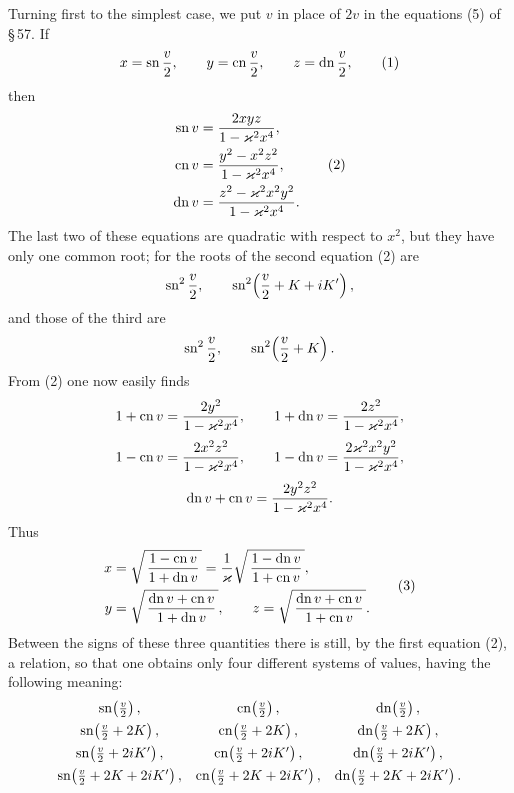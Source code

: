 \documentclass[11pt]{article}
\providecommand{\sn}{\operatorname{sn}}
\providecommand{\cn}{\operatorname{cn}}
\providecommand{\dn}{\operatorname{dn}}
\begin{document}
Turning first to the simplest case, we put $v$ in place of $2v$ in the equations (5) of
\S\,57. If
\begin{equation}
x=\sn {v\over2},\qquad y=\cn {v\over2},\qquad z=\dn {v\over2},
\tag{1}
\end{equation}
then
\begin{equation}
\begin{aligned}
\sn v&={2xyz\over1-\varkappa^2x^4},\\
\cn v&={y^2-x^2z^2\over1-\varkappa^2x^4},\\
\dn v&={z^2-\varkappa^2x^2y^2\over1-\varkappa^2x^4}.
\end{aligned}
\tag{2}
\end{equation}
The last two of these equations are quadratic with respect to $x^2$, but they have only
one common root; for the roots of the second equation (2) are
\[
\sn^2{v\over2},\qquad \sn^2\!\left({v\over2}+K+iK'\right),
\]
and those of the third are
\[
\sn^2{v\over2},\qquad \sn^2\!\left({v\over2}+K\right).
\]
From (2) one now easily finds
\[
1+\cn v={2y^2\over1-\varkappa^2x^4},\qquad
1+\dn v={2z^2\over1-\varkappa^2x^4},
\]
\[
1-\cn v={2x^2z^2\over1-\varkappa^2x^4},\qquad
1-\dn v={2\varkappa^2x^2y^2\over1-\varkappa^2x^4},
\]
\[
\dn v+\cn v={2y^2z^2\over1-\varkappa^2x^4}.
\]
Thus
\begin{equation}
\begin{aligned}
x&=\sqrt{\,{1-\cn v\over1+\dn v}\,}
={1\over\varkappa}\sqrt{\,{1-\dn v\over1+\cn v}\,},\\
y&=\sqrt{\,{\dn v+\cn v\over1+\dn v}\,},
\qquad
z=\sqrt{\,{\dn v+\cn v\over1+\cn v}\,}.
\end{aligned}
\tag{3}
\end{equation}
Between the signs of these three quantities there is still, by the first equation (2), a
relation, so that one obtains only four different systems of values, having the following
meaning:
\[
\begin{array}{ccc}
\sn\!\left({v\over2}\right),&\cn\!\left({v\over2}\right),&\dn\!\left({v\over2}\right),\\[0.4em]
\sn\!\left({v\over2}+2K\right),&\cn\!\left({v\over2}+2K\right),&\dn\!\left({v\over2}+2K\right),\\[0.4em]
\sn\!\left({v\over2}+2iK'\right),&\cn\!\left({v\over2}+2iK'\right),&\dn\!\left({v\over2}+2iK'\right),\\[0.4em]
\sn\!\left({v\over2}+2K+2iK'\right),&
\cn\!\left({v\over2}+2K+2iK'\right),&
\dn\!\left({v\over2}+2K+2iK'\right).
\end{array}
\]
\end{document}
